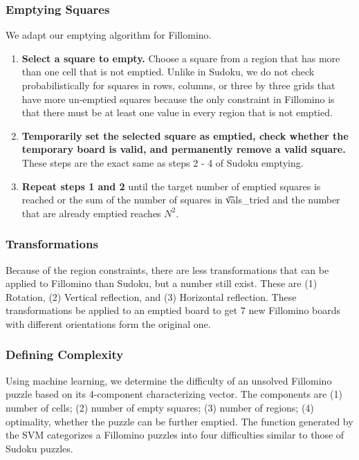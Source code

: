 \subsubsection*{Emptying Squares}

We adapt our emptying algorithm for Fillomino.

\begin{enumerate}
\item {\bf Select a square to empty.} Choose a square from a region
  that has more than one cell that is not emptied. Unlike in Sudoku, we do not check probabilistically for squares in rows, columns, or three by three grids that have more un-emptied squares because the only constraint in Fillomino is that there must be at least one value in every region that is not emptied.
\item {\bf Temporarily set the selected square as emptied, check whether the temporary board is valid, and permanently remove a valid square.} These steps are the exact same as steps 2 - 4 of Sudoku emptying.
\item{\bf Repeat steps 1 and 2} until the target number of emptied squares is reached or the sum of the number of squares in \t{vals\_tried} and the number that are already emptied reaches $N^2$. 
\end{enumerate}

\subsubsection*{Transformations}
Because of the region constraints, there are less
transformations that can be applied to Fillomino than Sudoku, but a
number still exist. These are (1) Rotation, (2) Vertical reflection, and (3) Horizontal reflection. These transformations be applied to an emptied board to get 7 new Fillomino boards with different orientations form the original one.

\subsubsection*{Defining Complexity}
Using machine learning, we determine the difficulty of an unsolved
Fillomino puzzle based on its 4-component characterizing vector. The components are (1) number of cells; (2) number of empty squares; (3) number of regions; (4) optimality, whether the puzzle can be further emptied. The function generated by the SVM categorizes a Fillomino puzzles into four difficulties similar to those of Sudoku puzzles.

